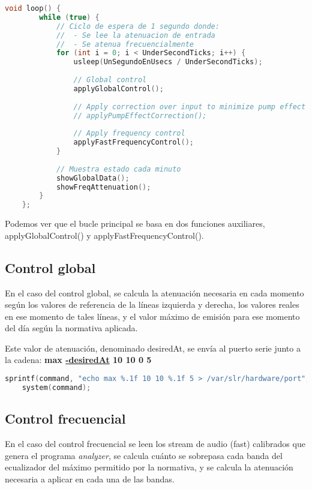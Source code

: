 \documentclass[]{article}
\begin{document}
\begin{lstlisting}[language=c++ ,caption=Bucle principal del limitador de sonido]
	void loop() {
		while (true) {
			// Ciclo de espera de 1 segundo donde:
			//	- Se lee la atenuacion de entrada
			//	- Se atenua frecuencialmente
			for (int i = 0; i < UnderSecondTicks; i++) {
				usleep(UnSegundoEnUsecs / UnderSecondTicks);
				
				// Global control
				applyGlobalControl();
				
				// Apply correction over input to minimize pump effect
				// applyPumpEffectCorrection();
				
				// Apply frequency control
				applyFastFrequencyControl();
			}
			
			// Muestra estado cada minuto
			showGlobalData();
			showFreqAttenuation();
		}
	};
\end{lstlisting}

Podemos ver que el bucle principal se basa en dos funciones auxiliares, applyGlobalControl() y applyFastFrequencyControl().

\subsection{Control global}
En el caso del control global, se calcula la atenuación necesaria en cada momento según los valores de referencia de la líneas izquierda y derecha, los valores reales en ese momento de tales líneas, y el valor máximo de emisión para ese momento del día según la normativa aplicada. 

Este valor de atenuación, denominado desiredAt, se envía al puerto serie junto a la cadena: \textbf{max \underline{-desiredAt} 10 10 0 5}

\begin{lstlisting}[language=c++ ,caption=Control global]
	sprintf(command, "echo max %.1f 10 10 %.1f 5 > /var/slr/hardware/port", -desiredAt, 0.0f);
	system(command);
\end{lstlisting}

\subsection{Control frecuencial}
En el caso del control frecuencial se leen los stream de audio (fast) calibrados que genera el programa \emph{analyzer}, se calcula cuánto se sobrepasa cada banda del ecualizador del máximo permitido por la normativa, y se calcula la atenuación necesaria a aplicar en cada una de las bandas.
\end{document}
